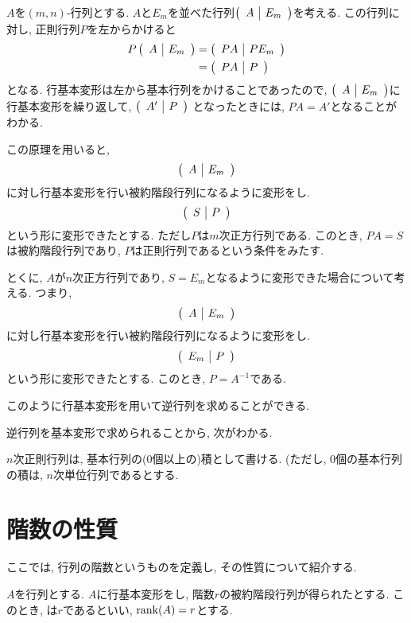 \begin{remark}
  $A$を$(m,n)$-行列とする.
  $A$と$E_m$を並べた行列$\left(\begin{array}{c|c}A& E_m\end{array}\right)$を考える.
  この行列に対し, 正則行列$P$を左からかけると
  \begin{align*}
    P\left(\begin{array}{c|c}A& E_m\end{array}\right)&=\left(\begin{array}{c|c}PA& PE_m\end{array}\right)\\
    &=\left(\begin{array}{c|c}PA& P\end{array}\right)
  \end{align*}
  となる.
  行基本変形は左から基本行列をかけることであったので,
  $\left(\begin{array}{c|c}A& E_m\end{array}\right)$に行基本変形を繰り返して,
  $\left(\begin{array}{c|c}A'& P\end{array}\right)$
  となったときには, $PA=A'$となることがわかる.


  この原理を用いると,
  \begin{align*}
    \left(\begin{array}{c|c}A& E_m\end{array}\right)
  \end{align*}
  に対し行基本変形を行い被約階段行列になるように変形をし.
  \begin{align*}
    \left(\begin{array}{c|c}S& P\end{array}\right)
  \end{align*}
  という形に変形できたとする.
  ただし$P$は$m$次正方行列である.
  このとき, $PA=S$は被約階段行列であり, $P$は正則行列であるという条件をみたす.

  とくに, $A$が$n$次正方行列であり, $S=E_m$となるように変形できた場合について考える.
  つまり,
  \begin{align*}
    \left(\begin{array}{c|c}A& E_m\end{array}\right)
  \end{align*}
  に対し行基本変形を行い被約階段行列になるように変形をし.
  \begin{align*}
    \left(\begin{array}{c|c}E_m& P\end{array}\right)
  \end{align*}
  という形に変形できたとする.
  このとき, $P=A^{-1}$である.

  このように行基本変形を用いて逆行列を求めることができる.
\end{remark}

逆行列を基本変形で求められることから,
次がわかる.
\begin{cor}
  $n$次正則行列は,
  基本行列の($0$個以上の)積として書ける.
  (ただし, $0$個の基本行列の積は,
  $n$次単位行列であるとする.
\end{cor}


\section{階数の性質}
ここでは,
行列の階数というものを定義し,
その性質について紹介する.

\begin{definition}
  \label{def:rank}
  $A$を行列とする.
  $A$に行基本変形をし,
  階数$r$の被約階段行列が得られたとする.
  このとき, 
  は$r$であるといい,
  $\operatorname{rank}(A)=r$とする.
\end{definition}

